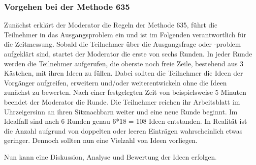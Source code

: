 \subsubsection*{Vorgehen bei der Methode 635}
Zunächst erklärt der Moderator die Regeln der Methode 635, führt die Teilnehmer in das Ausgangsproblem ein und ist im Folgenden verantwortlich für die Zeitmessung. Sobald die Teilnehmer über die Ausgangsfrage oder -problem aufgeklärt sind, startet der Moderator die erste von sechs Runden. In jeder Runde werden die Teilnehmer aufgerufen, die oberste noch freie Zeile, bestehend aus 3 Kästchen, mit ihren Ideen zu füllen. Dabei sollten die Teilnehmer die Ideen der Vorgänger aufgreifen, erweitern und/oder weiterentwickeln ohne die Ideen zunächst zu bewerten. Nach einer festgelegten Zeit von beispielsweise 5 Minuten beendet der Moderator die Runde. Die Teilnehmer reichen ihr Arbeitsblatt im Uhrzeigersinn an ihren Sitznachbarn weiter und eine neue Runde beginnt. Im Idealfall sind nach 6 Runden genau 6*18 = 108 Ideen entstanden. In Realität ist die Anzahl aufgrund von doppelten oder leeren Einträgen wahrscheinlich etwas geringer. Dennoch sollten nun eine Vielzahl von Ideen vorliegen.


Nun kann eine Diskussion, Analyse und Bewertung der Ideen erfolgen.

\newpage


\newpage


\newpage


\newpage


\newpage


\newpage


\newpage


\newpage


\newpage

